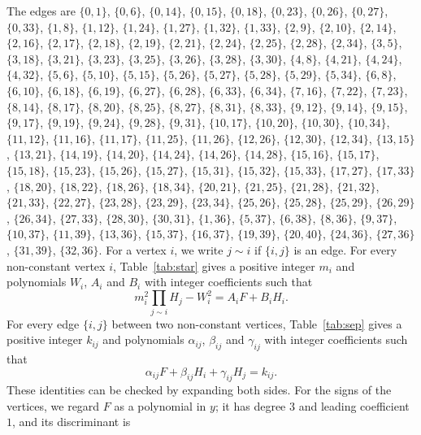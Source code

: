 \documentclass[11pt]{article}
\begin{document}
The edges are $\{0,1\}$, $\{0,6\}$, $\{0,14\}$, $\{0,15\}$, $\{0,18\}$, $\{0,23\}$, $\{0,26\}$, $\{0,27\}$, $\{0,33\}$, $\{1,8\}$, $\{1,12\}$, $\{1,24\}$, $\{1,27\}$, $\{1,32\}$, $\{1,33\}$, $\{2,9\}$, $\{2,10\}$, $\{2,14\}$, $\{2,16\}$, $\{2,17\}$, $\{2,18\}$, $\{2,19\}$, $\{2,21\}$, $\{2,24\}$, $\{2,25\}$, $\{2,28\}$, $\{2,34\}$, $\{3,5\}$, $\{3,18\}$, $\{3,21\}$, $\{3,23\}$, $\{3,25\}$, $\{3,26\}$, $\{3,28\}$, $\{3,30\}$, $\{4,8\}$, $\{4,21\}$, $\{4,24\}$, $\{4,32\}$, $\{5,6\}$, $\{5,10\}$, $\{5,15\}$, $\{5,26\}$, $\{5,27\}$, $\{5,28\}$, $\{5,29\}$, $\{5,34\}$, $\{6,8\}$, $\{6,10\}$, $\{6,18\}$, $\{6,19\}$, $\{6,27\}$, $\{6,28\}$, $\{6,33\}$, $\{6,34\}$, $\{7,16\}$, $\{7,22\}$, $\{7,23\}$, $\{8,14\}$, $\{8,17\}$, $\{8,20\}$, $\{8,25\}$, $\{8,27\}$, $\{8,31\}$, $\{8,33\}$, $\{9,12\}$, $\{9,14\}$, $\{9,15\}$, $\{9,17\}$, $\{9,19\}$, $\{9,24\}$, $\{9,28\}$, $\{9,31\}$, $\{10,17\}$, $\{10,20\}$, $\{10,30\}$, $\{10,34\}$, $\{11,12\}$, $\{11,16\}$, $\{11,17\}$, $\{11,25\}$, $\{11,26\}$, $\{12,26\}$, $\{12,30\}$, $\{12,34\}$, $\{13,15\}$, $\{13,21\}$, $\{14,19\}$, $\{14,20\}$, $\{14,24\}$, $\{14,26\}$, $\{14,28\}$, $\{15,16\}$, $\{15,17\}$, $\{15,18\}$, $\{15,23\}$, $\{15,26\}$, $\{15,27\}$, $\{15,31\}$, $\{15,32\}$, $\{15,33\}$, $\{17,27\}$, $\{17,33\}$, $\{18,20\}$, $\{18,22\}$, $\{18,26\}$, $\{18,34\}$, $\{20,21\}$, $\{21,25\}$, $\{21,28\}$, $\{21,32\}$, $\{21,33\}$, $\{22,27\}$, $\{23,28\}$, $\{23,29\}$, $\{23,34\}$, $\{25,26\}$, $\{25,28\}$, $\{25,29\}$, $\{26,29\}$, $\{26,34\}$, $\{27,33\}$, $\{28,30\}$, $\{30,31\}$, $\{1,36\}$, $\{5,37\}$, $\{6,38\}$, $\{8,36\}$, $\{9,37\}$, $\{10,37\}$, $\{11,39\}$, $\{13,36\}$, $\{15,37\}$, $\{16,37\}$, $\{19,39\}$, $\{20,40\}$, $\{24,36\}$, $\{27,36\}$, $\{31,39\}$, $\{32,36\}$. For a vertex $i$, we write $j\sim i$ if $\{i,j\}$ is an edge.
For every non-constant vertex $i$, Table~\ref{tab:star} gives a positive integer $m_{i}$ and polynomials $W_{i}$, $A_{i}$ and $B_{i}$ with integer coefficients such that
\begin{equation}\label{eq:star}
m_i^2\prod_{j\sim i}H_j-W_i^2=A_iF+B_iH_i.
\end{equation}
For every edge $\{i,j\}$ between two non-constant vertices, Table~\ref{tab:sep} gives a positive integer $k_{ij}$ and polynomials $\alpha_{ij}$, $\beta_{ij}$ and $\gamma_{ij}$ with integer coefficients such that
\begin{equation}\label{eq:sep}
\alpha_{ij}F+\beta_{ij}H_i+\gamma_{ij}H_j=k_{ij}.
\end{equation}
These identities can be checked by expanding both sides.
For the signs of the vertices, we regard $F$ as a polynomial in $y$; it has degree $3$ and leading coefficient $1$, and its discriminant is
\end{document}
